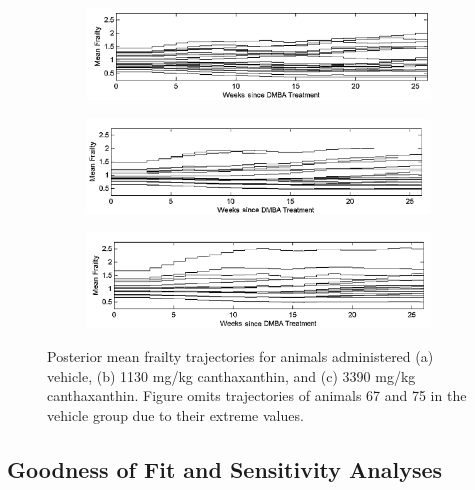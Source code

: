 \documentclass[10pt, letterpaper]{article}
\begin{document}
\begin{figure}[htbp]
    \centering
     \begin{subfigure}[b]{0.8\textwidth}
        \includegraphics[width=\textwidth]{figure2a.png} %
        \caption{}
        \label{fig:2a}
    \end{subfigure}
    \vfill
    \begin{subfigure}[b]{0.8\textwidth}
        \includegraphics[width=\textwidth]{figure2b.png} %
        \caption{}
        \label{fig:2b}
    \end{subfigure}
     \vfill
     \begin{subfigure}[b]{0.8\textwidth}
        \includegraphics[width=\textwidth]{figure2c.png} %
        \caption{}
        \label{fig:2c}
    \end{subfigure}
    \caption{Posterior mean frailty trajectories for animals administered (a) vehicle, (b) 1130 mg/kg canthaxanthin, and (c) 3390 mg/kg canthaxanthin. Figure omits trajectories of animals 67 and 75 in the vehicle group due to their extreme values.}
    \label{fig:2}
\end{figure}


\subsection{Goodness of Fit and Sensitivity Analyses}
\end{document}

